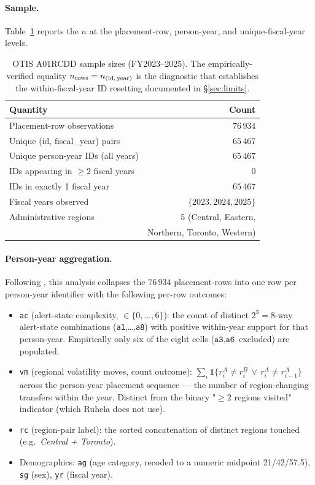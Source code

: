 \documentclass[11pt,a4paper]{article}
\newcommand{\1}{\mathbf{1}}
\theoremstyle{plain}
\theoremstyle{definition}
\begin{document}
\paragraph{Sample.}  Table~\ref{tab:n} reports the $n$ at the
placement-row, person-year, and unique-fiscal-year levels.

\begin{table}[h]
\centering\small
\caption{OTIS A01RCDD sample sizes (FY2023--2025).  The
empirically-verified equality $n_{\text{rows}} =
n_{\text{(id,\,year)}}$ is the diagnostic that establishes the
within-fiscal-year ID resetting documented in
§\ref{sec:limits}.}\label{tab:n}
\begin{tabular}{lr}
\toprule
Quantity & Count\\\midrule
Placement-row observations          & $76\,934$\\
Unique (id, fiscal\_year) pairs     & $65\,467$\\
Unique person-year IDs (all years)  & $65\,467$\\
\midrule
IDs appearing in $\ge 2$ fiscal years & $0$\\
IDs in exactly 1 fiscal year          & $65\,467$\\\midrule
Fiscal years observed               & $\{2023, 2024, 2025\}$\\
Administrative regions              & 5 (Central, Eastern,\\
                                    & \quad Northern, Toronto, Western)\\
\bottomrule
\end{tabular}
\end{table}

\paragraph{Person-year aggregation.}  Following
\cite[notez1a.qmd]{ruhela2026otisrc}, this analysis collapses the $76\,934$
placement-rows into one row per person-year identifier with the
following per-row outcomes:
\begin{itemize}
\setlength{\itemsep}{1pt}
\item \texttt{ac} (alert-state complexity, $\in\{0,\dots,6\}$):
  the count of distinct $2^3=8$-way alert-state combinations
  (\texttt{a1},\dots,\texttt{a8}) with positive within-year support
  for that person-year.  Empirically only six of the eight cells
  ($\texttt{a3},\texttt{a6}$ excluded) are populated.
\item \texttt{vm} (regional volatility moves, count outcome):
  $\sum_i \1\{r^A_i \ne r^B_i \,\vee\, r^A_i \ne r^A_{i-1}\}$
  across the person-year placement sequence — the number of
  region-changing transfers within the year.  Distinct from the
  binary "$\ge 2$ regions visited" indicator (which Ruhela does not use).
\item \texttt{rc} (region-pair label): the sorted concatenation of
  distinct regions touched (e.g.\ \emph{Central + Toronto}).
\item Demographics: \texttt{ag} (age category, recoded to a numeric
  midpoint 21/42/57.5), \texttt{sg} (sex), \texttt{yr} (fiscal year).
\end{itemize}
\end{document}
